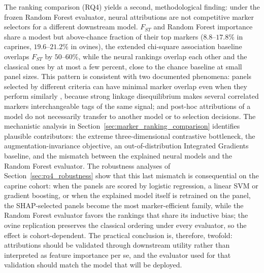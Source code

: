 The ranking comparison (RQ4) yields a second, methodological finding:
under the frozen Random Forest evaluator, neural attributions are not
competitive marker selectors for a different downstream model. $F_{ST}$
and Random Forest importance share a modest
but above-chance fraction of their top markers ($8.8$--$17.8\%$
in caprines, $19.6$--$21.2\%$ in ovines), the extended chi-square
association baseline overlaps $F_{ST}$ by $50$--$60\%$,
while the neural rankings overlap each other and the classical ones by
at most a few percent, close to the chance baseline at small panel
sizes. This pattern is consistent with two documented phenomena:
panels selected by different criteria can have minimal marker overlap
even when they perform similarly \cite{soundararajan2016minimal},
because strong linkage disequilibrium makes several correlated markers
interchangeable tags of the same signal; and post-hoc attributions of
a model do not necessarily transfer to another model or to selection
decisions. The mechanistic analysis in
Section~\ref{sec:marker_ranking_comparison} identifies plausible
contributors: the extreme three-dimensional contrastive bottleneck,
the augmentation-invariance objective, an out-of-distribution
Integrated Gradients baseline, and the mismatch between the explained
neural models and the Random Forest evaluator. The robustness analyses
of Section~\ref{sec:rq4_robustness} show that this last mismatch is
consequential on the caprine cohort: when the panels are scored by
logistic regression, a linear SVM or gradient boosting, or when the
explained model itself is retrained on the panel, the SHAP-selected
panels become the most marker-efficient family, while the Random
Forest evaluator favors the rankings that share its inductive bias;
the ovine replication preserves the classical ordering under every
evaluator, so the effect is cohort-dependent. The practical conclusion is,
therefore, twofold: attributions should be validated through downstream
utility rather than interpreted as feature importance per se, and the
evaluator used for that validation should match the model that will
be deployed.


